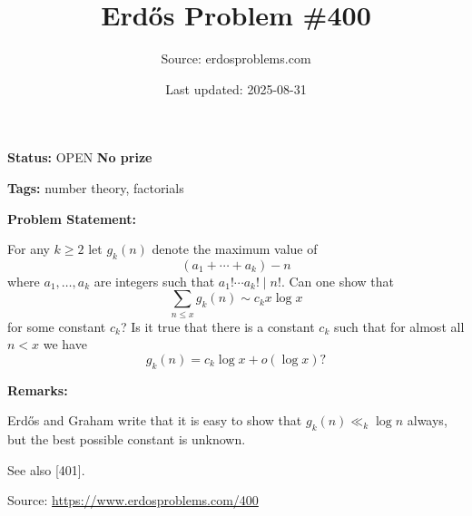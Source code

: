 \documentclass{article}
\title{Erd\H{o}s Problem \#400}
\date{Last updated: 2025-08-31}
\author{Source: erdosproblems.com}
\begin{document}
\maketitle

\noindent\textbf{Status:} OPEN \quad \textbf{No prize}

\noindent\textbf{Tags:} number theory, factorials

\medskip
\noindent\textbf{Problem Statement:}

For any $k\geq 2$ let $g_k(n)$ denote the maximum value of\[(a_1+\cdots+a_k)-n\]where $a_1,\ldots,a_k$ are integers such that $a_1!\cdots a_k! \mid n!$. Can one show that\[\sum_{n\leq x}g_k(n) \sim c_k x\log x\]for some constant $c_k$? Is it true that there is a constant $c_k$ such that for almost all $n<x$ we have\[g_k(n)=c_k\log x+o(\log x)?\]

\bigskip
\noindent\textbf{Remarks:}

Erd\H{o}s and Graham write that it is easy to show that $g_k(n) \ll_k \log n$ always, but the best possible constant is unknown.

See also [401].

\bigskip
\noindent\small{Source: \url{https://www.erdosproblems.com/400}}
\end{document}

